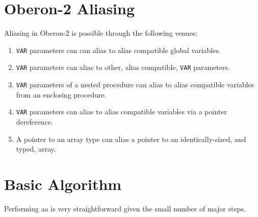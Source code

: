 \section{Oberon-2 Aliasing}

Aliasing in Oberon-2 is possible through the following venues:

\begin{enumerate}
\item \texttt{VAR} parameters can can alias to alias compatible global
  variables.

\item \texttt{VAR} parameters can alias to other, alias compatible,
  \texttt{VAR} parameters.

\item \texttt{VAR} parameters of a nested procedure can alias to alias
  compatible variables from an enclosing procedure.

\item \texttt{VAR} parameters can alias to alias compatible variables
  via a pointer dereference.

\item A pointer to an array type can alias a pointer to an
  identically-sized, and typed, array.
\end{enumerate}





\section{Basic Algorithm}

Performing \ac{aa} is very straightforward given the small number of
major steps.

